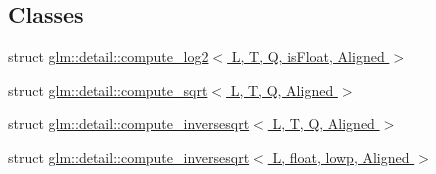 \subsection*{Classes}
\begin{DoxyCompactItemize}
\item 
struct \hyperlink{structglm_1_1detail_1_1compute__log2}{glm\+::detail\+::compute\+\_\+log2$<$ L, T, Q, is\+Float, Aligned $>$}
\item 
struct \hyperlink{structglm_1_1detail_1_1compute__sqrt}{glm\+::detail\+::compute\+\_\+sqrt$<$ L, T, Q, Aligned $>$}
\item 
struct \hyperlink{structglm_1_1detail_1_1compute__inversesqrt}{glm\+::detail\+::compute\+\_\+inversesqrt$<$ L, T, Q, Aligned $>$}
\item 
struct \hyperlink{structglm_1_1detail_1_1compute__inversesqrt_3_01L_00_01float_00_01lowp_00_01Aligned_01_4}{glm\+::detail\+::compute\+\_\+inversesqrt$<$ L, float, lowp, Aligned $>$}
\end{DoxyCompactItemize}

